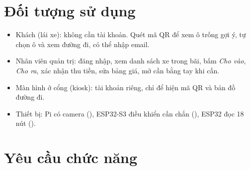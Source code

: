 \section{Đối tượng sử dụng}

\begin{itemize}
  \item Khách (lái xe): không cần tài khoản. Quét mã QR để xem ô trống gợi ý, tự chọn ô và xem đường đi, có thể nhập email.
  \item Nhân viên quản trị: đăng nhập, xem danh sách xe trong bãi, bấm \emph{Cho vào}, \emph{Cho ra}, xác nhận thu tiền, sửa bảng giá, mở cần bằng tay khi cần.
  \item Màn hình ở cổng (kiosk): tài khoản riêng, chỉ để hiện mã QR và bản đồ đường đi.
  \item Thiết bị: Pi có camera (), ESP32-S3 điều khiển cần chắn (), ESP32 đọc 18 nút ().
\end{itemize}

\section{Yêu cầu chức năng}

